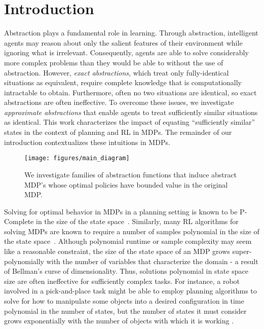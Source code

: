 \section{Introduction}
\label{sec:intro}

Abstraction plays a fundamental role in learning. Through abstraction, intelligent agents may reason about only the salient features of their environment while ignoring what is irrelevant. Consequently, agents are able to solve considerably more complex problems than they would be able to without the use of abstraction. However, \textit{exact abstractions}, which treat only fully-identical situations as equivalent, require complete knowledge that is computationally intractable to obtain. Furthermore, often no two situations are identical, so exact abstractions are often ineffective. To overcome these issues, we investigate \textit{approximate abstractions} that enable agents to treat sufficiently similar situations as identical. This work characterizes the impact of equating ``sufficiently similar'' states in the context of planning and \ac{RL} in \acp{MDP}. The remainder of our introduction contextualizes these intuitions in \acp{MDP}.

\begin{figure}[h]
\centering
\texttt{[image: figures/main\_diagram]}
\caption{We investigate families of abstraction functions that induce abstract MDP's whose optimal policies have bounded value in the original MDP.}
\end{figure}


Solving for optimal behavior in \acp{MDP} in a planning setting is known to be P-Complete in the size of the state space~\cite{papadimitriou1987complexity,littman1995complexity}. Similarly, many \ac{RL} algorithms for solving \acp{MDP} are known to require a number of samples polynomial in the size of the state space~\cite{Strehl2009}. Although polynomial runtime or sample complexity may seem like a reasonable constraint, the size of the state space of an \ac{MDP} grows super-polynomially with the number of variables that characterize the domain - a result of Bellman's curse of dimensionality. Thus, solutions polynomial in state space size are often ineffective for sufficiently complex tasks. For instance, a robot involved in a pick-and-place task might be able to employ planning algorithms to solve for how to manipulate some objects into a desired configuration in time polynomial in the number of states, but the number of states it must consider grows exponentially with the number of objects with which it is working \cite{abel2015goal}.

